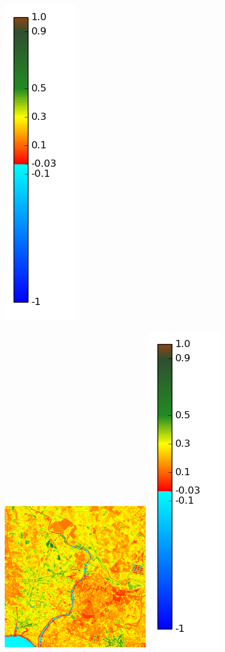 \documentclass{book}
\begin{document}
\begin{figure}[H]
{\includegraphics[scale=0.2]{images/colormap.png}
}
\centerline{
\includegraphics[scale=0.4]{images/Agde/08_ndvi.png}
\includegraphics[scale=0.2]{images/colormap.png}
}
\end{figure}
\end{document}
